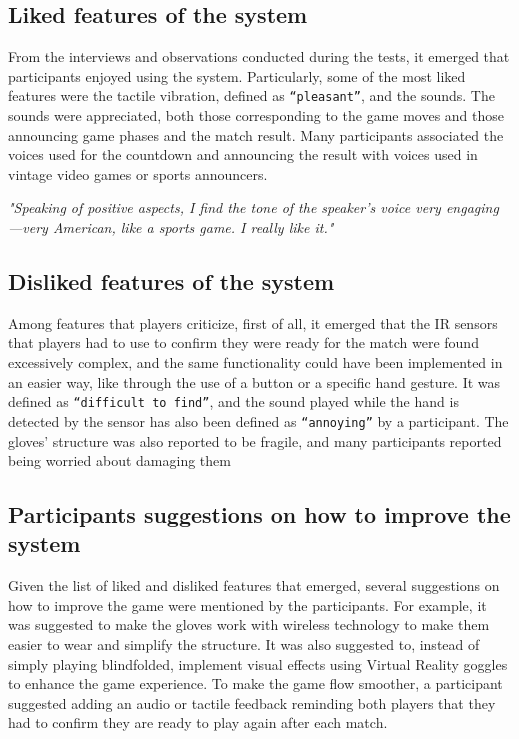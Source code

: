\documentclass[11pt,a4paper]{report}
\begin{document}
\subsection*{Liked features of the system}
From the interviews and observations conducted during the tests, it emerged that participants enjoyed using the system. Particularly, some of the most liked features were the tactile vibration, defined as \texttt{“pleasant”}, and the sounds. The sounds were appreciated, both those corresponding to the game moves and those announcing game phases and the match result. Many participants associated the voices used for the countdown and announcing the result with voices used in vintage video games or sports announcers.
\begin{center}
  \textit{"Speaking of positive aspects, I find the tone of the speaker's voice very engaging—very American, like a sports game. I really like it."}
\end{center}

\subsection*{Disliked features of the system}
Among features that players criticize, first of all, it emerged that the IR sensors that players had to use to confirm they were ready for the match were found excessively complex, and the same functionality could have been implemented in an easier way, like through the use of a button or a specific hand gesture. It was defined as \texttt{“difficult to find”}, and the sound played while the hand is detected by the sensor has also been defined as \texttt{“annoying”} by a participant. The gloves' structure was also reported to be fragile, and many participants reported being worried about damaging them
\subsection*{Participants suggestions on how to improve the system
}
Given the list of liked and disliked features that emerged, several suggestions on how to improve the game were mentioned by the participants. For example, it was suggested to make the gloves work with wireless technology to make them easier to wear and simplify the structure. It was also suggested to, instead of simply playing blindfolded, implement visual effects using Virtual Reality goggles to enhance the game experience. To make the game flow smoother, a participant suggested adding an audio or tactile feedback reminding both players that they had to confirm they are ready to play again after each match.
\end{document}
